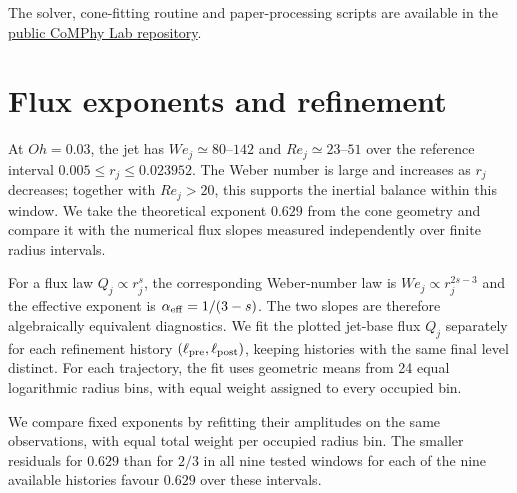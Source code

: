 \documentclass[10pt]{article}
\begin{document}
The solver, cone-fitting routine and paper-processing scripts are available in the \href{https://github.com/comphy-lab/Bursting-Bubble}{public CoMPhy Lab repository}.

\section*{Flux exponents and refinement}

At $Oh=0.03$, the jet has $We_j\simeq80$--$142$ and $Re_j\simeq23$--$51$ over the reference interval $0.005\le r_j\le0.023952$. The Weber number is large and increases as $r_j$ decreases; together with $Re_j>20$, this supports the inertial balance within this window. We take the theoretical exponent $0.629$ from the cone geometry and compare it with the numerical flux slopes measured independently over finite radius intervals.

For a flux law $Q_j\propto r_j^s$, the corresponding Weber-number law is $We_j\propto r_j^{2s-3}$ and the effective exponent is $\alpha_{\rm eff}=1/(3-s)$. The two slopes are therefore algebraically equivalent diagnostics. We fit the plotted jet-base flux $Q_j$ separately for each refinement history $(\ell_{\rm pre},\ell_{\rm post})$, keeping histories with the same final level distinct. For each trajectory, the fit uses geometric means from 24 equal logarithmic radius bins, with equal weight assigned to every occupied bin.

We compare fixed exponents by refitting their amplitudes on the same observations, with equal total weight per occupied radius bin. The smaller residuals for $0.629$ than for $2/3$ in all nine tested windows for each of the nine available histories favour $0.629$ over these intervals.
\end{document}
